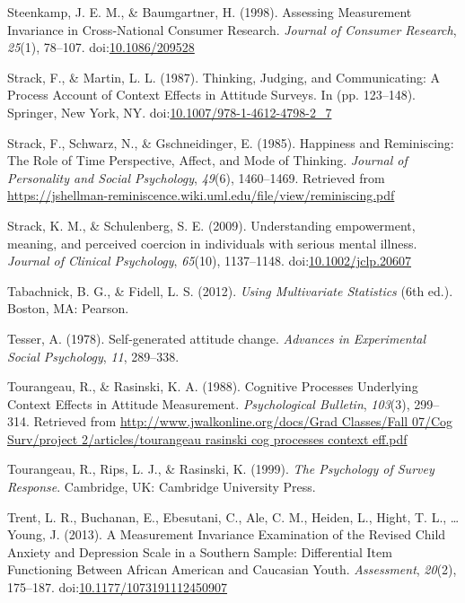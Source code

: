 \documentclass[english,man, mask]{apa6}
\theoremstyle{definition}
\theoremstyle{definition}
\theoremstyle{definition}
\theoremstyle{remark}
\begin{document}
\hypertarget{ref-Steenkamp1998}{}
Steenkamp, J. E. M., \& Baumgartner, H. (1998). Assessing Measurement
Invariance in Cross‐National Consumer Research. \emph{Journal of
Consumer Research}, \emph{25}(1), 78--107.
doi:\href{https://doi.org/10.1086/209528}{10.1086/209528}

\hypertarget{ref-Strack1987}{}
Strack, F., \& Martin, L. L. (1987). Thinking, Judging, and
Communicating: A Process Account of Context Effects in Attitude Surveys.
In (pp. 123--148). Springer, New York, NY.
doi:\href{https://doi.org/10.1007/978-1-4612-4798-2_7}{10.1007/978-1-4612-4798-2\_7}

\hypertarget{ref-Strack1985}{}
Strack, F., Schwarz, N., \& Gschneidinger, E. (1985). Happiness and
Reminiscing: The Role of Time Perspective, Affect, and Mode of Thinking.
\emph{Journal of Personality and Social Psychology}, \emph{49}(6),
1460--1469. Retrieved from
\url{https://jshellman-reminiscence.wiki.uml.edu/file/view/reminiscing.pdf}

\hypertarget{ref-Strack2009}{}
Strack, K. M., \& Schulenberg, S. E. (2009). Understanding empowerment,
meaning, and perceived coercion in individuals with serious mental
illness. \emph{Journal of Clinical Psychology}, \emph{65}(10),
1137--1148.
doi:\href{https://doi.org/10.1002/jclp.20607}{10.1002/jclp.20607}

\hypertarget{ref-Tabachnick2012}{}
Tabachnick, B. G., \& Fidell, L. S. (2012). \emph{Using Multivariate
Statistics} (6th ed.). Boston, MA: Pearson.

\hypertarget{ref-Tesser1978}{}
Tesser, A. (1978). Self-generated attitude change. \emph{Advances in
Experimental Social Psychology}, \emph{11}, 289--338.

\hypertarget{ref-Tourangeau1988}{}
Tourangeau, R., \& Rasinski, K. A. (1988). Cognitive Processes
Underlying Context Effects in Attitude Measurement. \emph{Psychological
Bulletin}, \emph{103}(3), 299--314. Retrieved from
\href{http://www.jwalkonline.org/docs/Grad\%20Classes/Fall\%2007/Cog\%20Surv/project\%202/articles/tourangeau\%20rasinski\%20cog\%20processes\%20context\%20eff.pdf}{http://www.jwalkonline.org/docs/Grad Classes/Fall 07/Cog Surv/project 2/articles/tourangeau rasinski cog processes context eff.pdf}

\hypertarget{ref-Tourangeau1999}{}
Tourangeau, R., Rips, L. J., \& Rasinski, K. (1999). \emph{The
Psychology of Survey Response}. Cambridge, UK: Cambridge University
Press.

\hypertarget{ref-Trent2013}{}
Trent, L. R., Buchanan, E., Ebesutani, C., Ale, C. M., Heiden, L.,
Hight, T. L., \ldots{} Young, J. (2013). A Measurement Invariance
Examination of the Revised Child Anxiety and Depression Scale in a
Southern Sample: Differential Item Functioning Between African American
and Caucasian Youth. \emph{Assessment}, \emph{20}(2), 175--187.
doi:\href{https://doi.org/10.1177/1073191112450907}{10.1177/1073191112450907}
\end{document}
